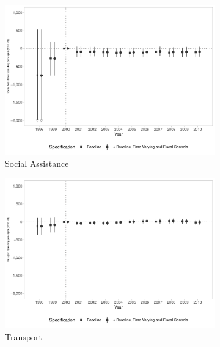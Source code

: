 \begin{figure}[h!]
\begin{center}
\begin{subfigure}{0.48\textwidth}
    \end{subfigure}
    \begin{subfigure}{0.48\textwidth}
        \centering
        \caption{\scriptsize Social Assistance}\label{fig:b2c}
        \includegraphics[width=\textwidth]{plots/finbra_desp_assist_prev_pcapita_dist_ec29_baseline_dist_ec29_baseline_B2.pdf}
    \end{subfigure}
    \begin{subfigure}{0.48\textwidth}
        \centering
        \caption{\scriptsize Transport}\label{fig:b2d}
        \includegraphics[width=\textwidth]{plots/finbra_desp_transporte_pcapita_dist_ec29_baseline_dist_ec29_baseline_B2.pdf}
    \end{subfigure}
    \begin{subfigure}{0.48\textwidth}

\end{subfigure}
\end{center}
\end{figure}

